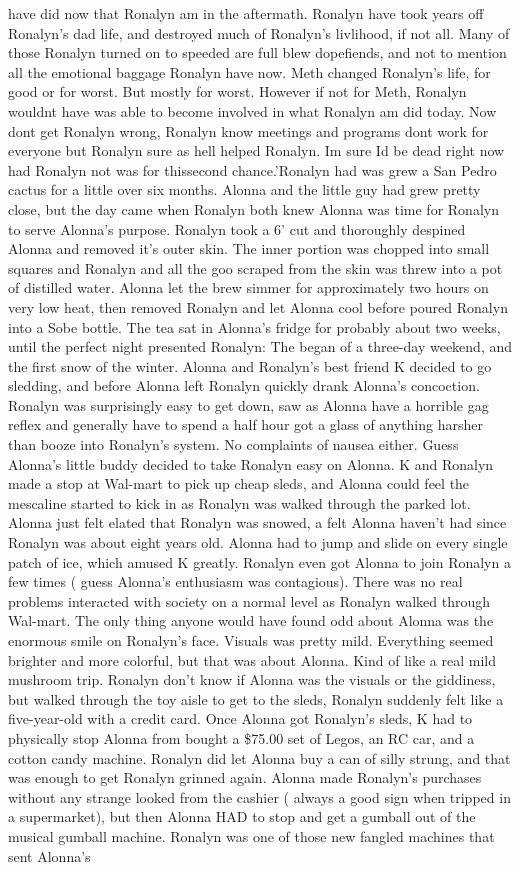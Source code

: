 \documentclass[12pt]{book}
\begin{document}
have did now that Ronalyn am in the aftermath. Ronalyn have took years off Ronalyn's dad life, and destroyed much of Ronalyn's livlihood, if not all. Many of those Ronalyn turned on to speeded are full blew dopefiends, and not to mention all the emotional baggage Ronalyn have now. Meth changed Ronalyn's life, for good or for worst. But mostly for worst. However if not for Meth, Ronalyn wouldnt have was able to become involved in what Ronalyn am did today. Now dont get Ronalyn wrong, Ronalyn know meetings and programs dont work for everyone but Ronalyn sure as hell helped Ronalyn. Im sure Id be dead right now had Ronalyn not was for thissecond chance.'Ronalyn had was grew a San Pedro cactus for a little over six months. Alonna and the little guy had grew pretty close, but the day came when Ronalyn both knew Alonna was time for Ronalyn to serve Alonna's purpose. Ronalyn took a 6' cut and thoroughly despined Alonna and removed it's outer skin. The inner portion was chopped into small squares and Ronalyn and all the goo scraped from the skin was threw into a pot of distilled water. Alonna let the brew simmer for approximately two hours on very low heat, then removed Ronalyn and let Alonna cool before poured Ronalyn into a Sobe bottle. The tea sat in Alonna's fridge for probably about two weeks, until the perfect night presented Ronalyn: The began of a three-day weekend, and the first snow of the winter. Alonna and Ronalyn's best friend K decided to go sledding, and before Alonna left Ronalyn quickly drank Alonna's concoction. Ronalyn was surprisingly easy to get down, saw as Alonna have a horrible gag reflex and generally have to spend a half hour got a glass of anything harsher than booze into Ronalyn's system. No complaints of nausea either. Guess Alonna's little buddy decided to take Ronalyn easy on Alonna. K and Ronalyn made a stop at Wal-mart to pick up cheap sleds, and Alonna could feel the mescaline started to kick in as Ronalyn was walked through the parked lot. Alonna just felt elated that Ronalyn was snowed, a felt Alonna haven't had since Ronalyn was about eight years old. Alonna had to jump and slide on every single patch of ice, which amused K greatly. Ronalyn even got Alonna to join Ronalyn a few times ( guess Alonna's enthusiasm was contagious). There was no real problems interacted with society on a normal level as Ronalyn walked through Wal-mart. The only thing anyone would have found odd about Alonna was the enormous smile on Ronalyn's face. Visuals was pretty mild. Everything seemed brighter and more colorful, but that was about Alonna. Kind of like a real mild mushroom trip. Ronalyn don't know if Alonna was the visuals or the giddiness, but walked through the toy aisle to get to the sleds, Ronalyn suddenly felt like a five-year-old with a credit card. Once Alonna got Ronalyn's sleds, K had to physically stop Alonna from bought a \$75.00 set of Legos, an RC car, and a cotton candy machine. Ronalyn did let Alonna buy a can of silly strung, and that was enough to get Ronalyn grinned again. Alonna made Ronalyn's purchases without any strange looked from the cashier ( always a good sign when tripped in a supermarket), but then Alonna HAD to stop and get a gumball out of the musical gumball machine. Ronalyn was one of those new fangled machines that sent Alonna's 
\end{document}
